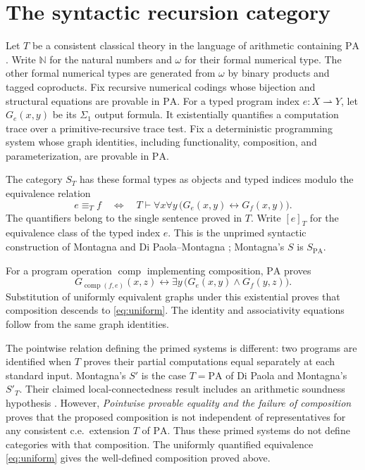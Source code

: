 \documentclass[11pt]{article}
\newcommand{\N}{\mathbb N}
\newcommand{\PA}{\mathrm{PA}}
\begin{document}
\section{The syntactic recursion category}\label{sec:syntactic}

Let $T$ be a consistent classical theory in the language of arithmetic
containing $\PA$. Write $\N$ for the natural numbers and $\omega$
for their formal numerical type. The other formal numerical types are
generated from $\omega$ by binary products and tagged coproducts.
Fix recursive numerical codings
whose bijection and structural equations are provable in $\PA$.
For a typed program index $e:X\rightharpoonup Y$, let $G_e(x,y)$ be its
$\Sigma_1$ output formula. It existentially quantifies a computation trace
over a primitive-recursive trace test. Fix a deterministic programming
system whose graph identities, including functionality, composition,
and parameterization, are provable in $\PA$.

The category $S_T$ has these formal types as objects and typed indices
modulo the equivalence relation
\begin{equation}\label{eq:uniform}
 e\equiv_T f
 \quad\Longleftrightarrow\quad
 T\vdash \forall x\forall y\,
       \bigl(G_e(x,y)\leftrightarrow G_f(x,y)\bigr).
\end{equation}
The quantifiers belong to the single sentence proved in $T$.
Write $[e]_T$ for the equivalence class of the typed index $e$.
This is the unprimed syntactic construction of Montagna and
Di Paola--Montagna \cite{Montagna,DPM}; Montagna's $S$ is $S_{\PA}$.

For a program operation $\operatorname{comp}$ implementing composition,
$\PA$ proves
\begin{equation}\label{eq:composition}
 G_{\operatorname{comp}(f,e)}(x,z)
 \leftrightarrow
 \exists y\,\bigl(G_e(x,y)\land G_f(y,z)\bigr).
\end{equation}
Substitution of uniformly equivalent graphs under this existential proves
that composition descends to \eqref{eq:uniform}. The identity and
associativity equations follow from the same graph identities.

The pointwise relation defining the primed systems is different:
two programs are identified when $T$ proves their partial computations
equal separately at each standard input. Montagna's $S'$ is the case
$T=\PA$ of Di Paola and Montagna's $S'_T$. Their claimed
local-connectedness result includes an arithmetic soundness hypothesis
\cite[Theorem 4.5, pp.~658--659]{DPM}. However,
\emph{Pointwise provable equality and the failure of composition}
\cite[Corollary 2]{Composition} proves that the proposed composition
is not independent of representatives for any consistent c.e.\
extension $T$ of $\PA$. Thus these primed systems do not define
categories with that composition. The uniformly quantified equivalence
\eqref{eq:uniform} gives the well-defined composition proved above.
\end{document}
